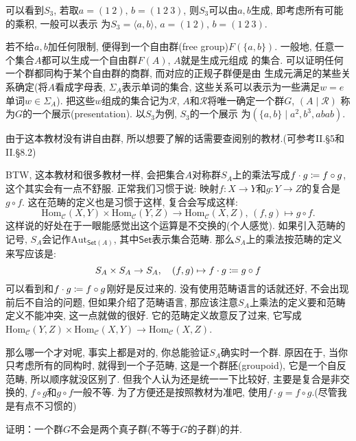 \begin{remark}
    可以看到$S_3$, 若取$a = (1\:2),\, b = (1\:2\:3)$,
则$S_3$可以由$a, b$生成, 即考虑所有可能的乘积, 一般可以表示
为$S_3 = \langle a, b \rangle,\, a = (1\:2),\, b = (1\:2\:3)$.

若不给$a, b$加任何限制, 便得到一个自由群(free group)$F(\{a, b\})$.
一般地, 任意一个集合$A$都可以生成一个自由群$F(A)$, $A$就是生成元组成
的集合. 可以证明任何一个群都同构于某个自由群的商群, 而对应的正规子群便是由
生成元满足的某些关系确定(将$A$看成字母表, $\Sigma_A$表示单词的集合,
这些关系可以表示为一些满足$w = e$单词$w \in \Sigma_A$).
把这些$w$组成的集合记为$\mathscr{R}$,
$A$和$\mathscr{R}$将唯一确定一个群$G$, $(A \mid \mathscr{R})$
称为$G$的一个展示(presentation). 以$S_3$为例, $S_3$的一个展示
为$(\{a, b\} \mid a^2, b^3, abab)$.

由于这本教材没有讲自由群, 所以想要了解的话需要查阅别的教材.(可参考\cite{aluffi2009algebra}II.\S5和II.\S8.2)

BTW, 这本教材和很多教材一样, 会把集合$A$对称群$S_A$上的乘法写成$f \cdot g \mathrel{\coloneqq} f \circ g$, 这个其实会有一点不舒服. 正常我们习惯于说: 映射$f:X \to Y$和$g:Y \to Z$的复合是$g \circ f$. 这在范畴的定义也是习惯于这样, 复合会写成这样:
\[
    \mathrm{Hom}_{\mathcal{C}}(X, Y) \times \mathrm{Hom}_{\mathcal{C}}(Y, Z) \to \mathrm{Hom}_{\mathcal{C}}(X, Z),\, (f, g) \mapsto g \circ f.
\]
这样说的好处在于一眼能感觉出这个运算是不交换的(个人感觉). 如果引入范畴的记号, $S_A$会记作$\mathrm{Aut}_{\mathsf{Set}(A)}$, 其中$\mathsf{Set}$表示集合范畴. 那么$S_A$上的乘法按范畴的定义来写应该是:
\[
    S_A \times S_A \to S_A,\quad (f, g) \mapsto f \cdot g \mathrel{\coloneqq} g \circ f
\]
可以看到和$f \cdot g \mathrel{\coloneqq} f \circ g$刚好是反过来的. 没有使用范畴语言的话就还好, 不会出现前后不自洽的问题, 但如果介绍了范畴语言, 那应该注意$S_A$上乘法的定义要和范畴定义不能冲突, 这一点\cite{hungerford2003algebra}就做的很好. 它的范畴定义故意反了过来, 它写成$\mathrm{Hom}_{\mathcal{C}}(Y, Z) \times \mathrm{Hom}_{\mathcal{C}}(X, Y) \to \mathrm{Hom}_{\mathcal{C}}(X, Z)$.

那么哪一个才对呢, 事实上都是对的, 你总能验证$S_A$确实时一个群. 原因在于, 当你只考虑所有的同构时, 就得到一个子范畴, 这是一个群胚(groupoid), 它是一个自反范畴, 所以顺序就没区别了. 但我个人认为还是统一一下比较好, 主要是复合是非交换的, $f \circ g$和$g \circ f$一般不等. 为了方便还是按照教材为准吧, 使用$f \cdot g = f \circ g$.(尽管我是有点不习惯的)
\end{remark}

\begin{problem}
    证明：一个群$G$不会是两个真子群(不等于$G$的子群)的并.
\end{problem}

